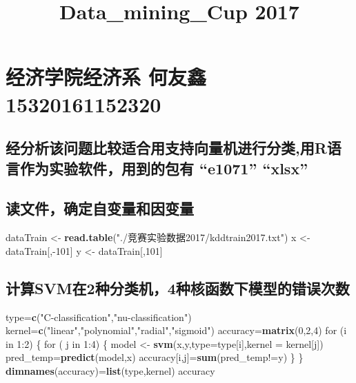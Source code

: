 \documentclass[]{article}
\title{Data\_mining\_Cup 2017}
\author{}
\date{}
\newenvironment{Shaded}{\begin{snugshade}}{\end{snugshade}}
\newcommand{\KeywordTok}[1]{\textcolor[rgb]{0.13,0.29,0.53}{\textbf{{#1}}}}
\newcommand{\DataTypeTok}[1]{\textcolor[rgb]{0.13,0.29,0.53}{{#1}}}
\newcommand{\DecValTok}[1]{\textcolor[rgb]{0.00,0.00,0.81}{{#1}}}
\newcommand{\StringTok}[1]{\textcolor[rgb]{0.31,0.60,0.02}{{#1}}}
\newcommand{\NormalTok}[1]{{#1}}
\begin{document}
\maketitle

\section{经济学院经济系 何友鑫 15320161152320}\label{--15320161152320}

\subsection{\texorpdfstring{经分析该问题比较适合用支持向量机进行分类,用R语言作为实验软件，用到的包有
``e1071''
``xlsx''}{经分析该问题比较适合用支持向量机进行分类,用R语言作为实验软件，用到的包有 e1071 xlsx}}\label{r-e1071-xlsx}

\subsection{读文件，确定自变量和因变量}

\begin{Shaded}
\begin{Highlighting}[]
\NormalTok{dataTrain <-}\StringTok{ }\KeywordTok{read.table}\NormalTok{(}\StringTok{"./竞赛实验数据2017/kddtrain2017.txt"}\NormalTok{)}
\NormalTok{x <-}\StringTok{ }\NormalTok{dataTrain[,-}\DecValTok{101}\NormalTok{]}
\NormalTok{y <-}\StringTok{ }\NormalTok{dataTrain[,}\DecValTok{101}\NormalTok{]}
\end{Highlighting}
\end{Shaded}

\subsection{计算SVM在2种分类机，4种核函数下模型的错误次数}\label{svm24}

\begin{Shaded}
\begin{Highlighting}[]
\NormalTok{type=}\KeywordTok{c}\NormalTok{(}\StringTok{"C-classification"}\NormalTok{,}\StringTok{"nu-classification"}\NormalTok{)}
\NormalTok{kernel=}\KeywordTok{c}\NormalTok{(}\StringTok{"linear"}\NormalTok{,}\StringTok{"polynomial"}\NormalTok{,}\StringTok{"radial"}\NormalTok{,}\StringTok{"sigmoid"}\NormalTok{)}
\NormalTok{accuracy=}\KeywordTok{matrix}\NormalTok{(}\DecValTok{0}\NormalTok{,}\DecValTok{2}\NormalTok{,}\DecValTok{4}\NormalTok{)}
\NormalTok{for (i in }\DecValTok{1}\NormalTok{:}\DecValTok{2}\NormalTok{)}
\NormalTok{\{}
  \NormalTok{for ( j in }\DecValTok{1}\NormalTok{:}\DecValTok{4}\NormalTok{) }
  \NormalTok{\{}
    \NormalTok{model <-}\StringTok{ }\KeywordTok{svm}\NormalTok{(x,y,}\DataTypeTok{type=}\NormalTok{type[i],}\DataTypeTok{kernel =} \NormalTok{kernel[j])}
    \NormalTok{pred_temp=}\KeywordTok{predict}\NormalTok{(model,x)}
    \NormalTok{accuracy[i,j]=}\KeywordTok{sum}\NormalTok{(pred_temp!=y)}
  \NormalTok{\}}
\NormalTok{\}}
\KeywordTok{dimnames}\NormalTok{(accuracy)=}\KeywordTok{list}\NormalTok{(type,kernel)}
\NormalTok{accuracy}
\end{Highlighting}
\end{Shaded}
\end{document}
